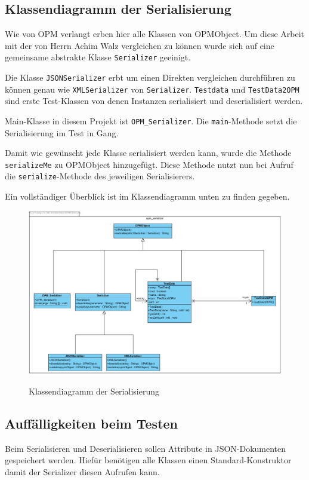 
\subsection{Klassendiagramm der Serialisierung}

Wie von OPM verlangt erben hier alle Klassen von OPMObject. Um diese Arbeit mit der von Herrn Achim Walz vergleichen zu k\"onnen wurde sich auf eine gemeinsame abstrakte Klasse \texttt{Serializer} geeinigt. 

Die Klasse \texttt{JSONSerializer} erbt um einen Direkten vergleichen durchf\"uhren zu k\"onnen genau wie \texttt{XMLSerializer} von \texttt{Serializer}.
\texttt{Testdata} und \texttt{TestData2OPM} sind erste Test-Klassen von denen Instanzen serialisiert und deserialisiert werden.

Main-Klasse in diesem Projekt ist \texttt{OPM\_Serializer}. Die \texttt{main}-Methode setzt die Serialisierung im Test in Gang.

Damit wie gew\"unscht jede Klasse serialisiert werden kann, wurde die Methode \texttt{serializeMe} zu OPMObject hinzugef\"ugt.
Diese Methode nutzt nun bei Aufruf die \texttt{serialize}-Methode des jeweiligen Serialisierers.

Ein vollst\"andiger \"Uberblick ist im Klassendiagramm unten zu finden gegeben.

\FloatBarrier
\begin{figure}[ht]
\includegraphics[width=16cm]{Bilder/Erstes_EKD}
\label{Klassendiagramm der Serialisierung}
\caption{Klassendiagramm der Serialisierung} 
\end{figure}

\subsection{Auff\"alligkeiten beim Testen}
Beim Serialisieren und Deserialisieren sollen Attribute in JSON-Dokumenten gespeichert werden. Hief\"ur ben\"otigen alle Klassen einen Standard-Konstruktor damit der Serializer diesen Aufrufen kann. 

